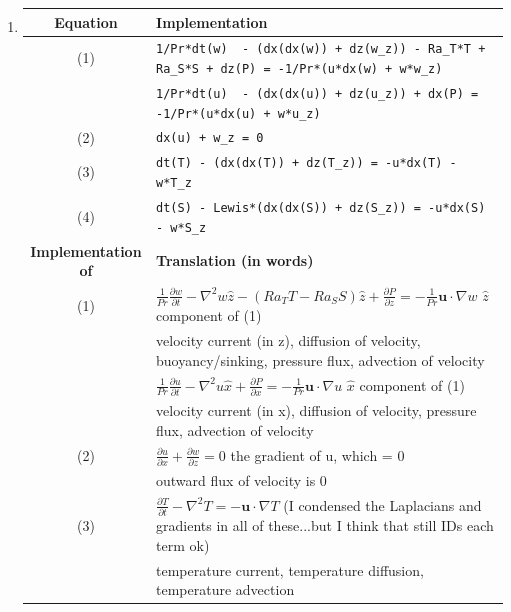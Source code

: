 \documentclass[10pt, preprint]{aastex}
\begin{document}
\begin{enumerate}
\item
\begin{table}[!ht]
  \centering
  \footnotesize
  \begin{tabular}{cl} \hline
    {\bf Equation} & {\bf Implementation} \\ \hline
    (1) & \verb|1/Pr*dt(w)  - (dx(dx(w)) + dz(w_z)) - Ra_T*T + Ra_S*S + dz(P) = -1/Pr*(u*dx(w) + w*w_z)| \\
    & \verb|1/Pr*dt(u)  - (dx(dx(u)) + dz(u_z)) + dx(P) = -1/Pr*(u*dx(u) + w*u_z)| \\
    (2) & \verb|dx(u) + w_z = 0| \\
    (3) & \verb|dt(T) - (dx(dx(T)) + dz(T_z)) = -u*dx(T) - w*T_z| \\
    (4) & \verb|dt(S) - Lewis*(dx(dx(S)) + dz(S_z)) = -u*dx(S) - w*S_z| \\
    \hline
    {\bf Implementation of} & {\bf Translation \hfill (in words)}\\ \hline
    (1) & $\frac{1}{Pr}\frac{\partial w}{\partial t} - \nabla^2 w\hat{z} - (Ra_TT-Ra_SS)\hat{z} 
    +\frac{\partial P}{\partial z} = -\frac{1}{Pr}\mathbf{u}\cdot \nabla w$ \hfill  $\hat{z}$ component of (1)\\
    & velocity current (in z), diffusion of velocity, buoyancy/sinking, pressure flux, advection of velocity \\
     & $\frac{1}{Pr}\frac{\partial u}{\partial t} - \nabla^2 u\hat{x} 
    +\frac{\partial P}{\partial x} = -\frac{1}{Pr}\mathbf{u}\cdot \nabla u$ \hfill  $\hat{x}$ component of (1)\\
    & velocity current (in x), diffusion of velocity, pressure flux, advection of velocity \\
    (2) & $\frac{\partial u}{\partial x} +\frac{\partial w}{\partial z} = 0$ \hfill the gradient of u, which = 0\\
    & outward flux of velocity is 0\\

    (3) & $ \frac{\partial T}{\partial t} -\nabla^2T = -\mathbf{u}\cdot \nabla T$ \hfill (I condensed the Laplacians and gradients in all of these...but I think that still IDs each term ok)\\
    & temperature current, temperature diffusion, temperature advection \\


\end{tabular}
\end{table}
\end{enumerate}
\end{document}
